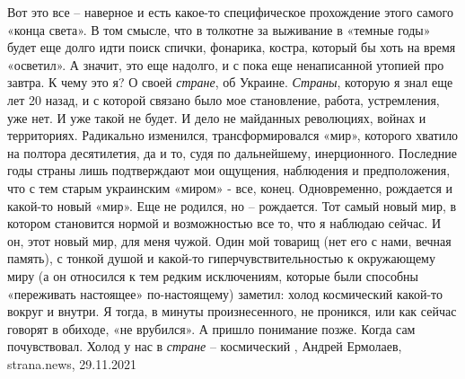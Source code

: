Вот это все – наверное и есть какое-то специфическое прохождение этого самого
«конца света». В том смысле, что в толкотне за выживание в «темные годы» будет
еще долго идти поиск спички, фонарика, костра, который бы хоть на время
«осветил». А значит, это еще надолго, и с пока еще ненаписанной утопией про
завтра.  К чему это я? О своей \emph{стране}, об Украине. \emph{Страны},
которую я знал еще лет 20 назад, и с которой связано было мое становление,
работа, устремления, уже нет.  И уже такой не будет. И дело не майданных
революциях, войнах и территориях.  Радикально изменился, трансформировался
«мир», которого хватило на полтора десятилетия, да и то, судя по дальнейшему,
инерционного. Последние годы страны лишь подтверждают мои ощущения, наблюдения
и предположения, что с тем старым украинским «миром» - все, конец.
Одновременно, рождается и какой-то новый «мир». Еще не родился, но – рождается.
Тот самый новый мир, в котором становится нормой и возможностью все то, что я
наблюдаю сейчас. И он, этот новый мир, для меня чужой.  Один мой товарищ (нет
его с нами, вечная память), с тонкой душой и какой-то гиперчувствительностью к
окружающему миру (а он относился к тем редким исключениям, которые были
способны «переживать настоящее» по-настоящему) заметил: холод космический
какой-то вокруг и внутри. Я тогда, в минуты произнесенного, не проникся, или
как сейчас говорят в обиходе, «не врубился». А пришло понимание позже.  Когда
сам почувствовал.  Холод у нас в \emph{стране} – космический
, 
Андрей Ермолаев, strana.news, 29.11.2021

